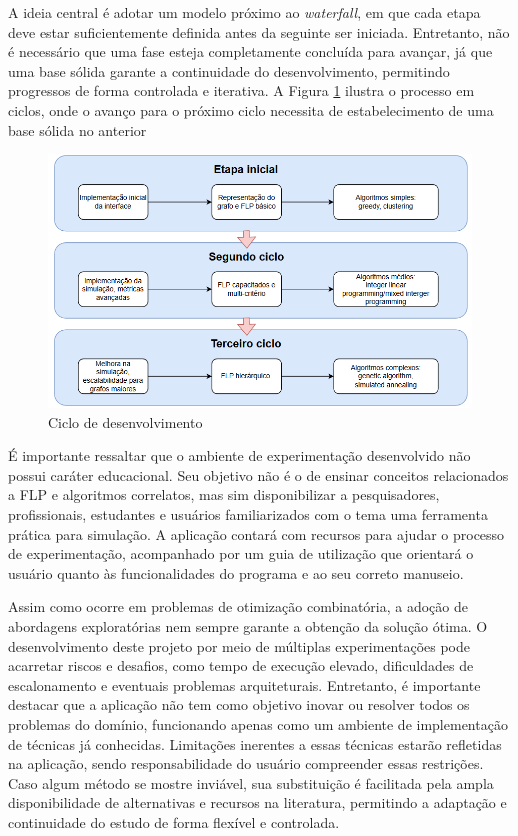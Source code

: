 A ideia central é adotar um modelo próximo ao \textit{waterfall}, em que cada etapa deve estar suficientemente definida antes da seguinte ser iniciada. Entretanto, não é necessário que uma fase esteja completamente concluída para avançar, já que uma base sólida garante a continuidade do desenvolvimento, permitindo progressos de forma controlada e iterativa. A Figura \ref{ciclo_dev} ilustra o processo em ciclos, onde o avanço para o próximo ciclo necessita de estabelecimento de uma base sólida no anterior

\begin{figure}[htb]
	\caption{\label{ciclo_dev}Ciclo de desenvolvimento}
	\begin{center}
	    \includegraphics[scale=0.8]{imagens/ciclo_dev.png}
	\end{center}
\end{figure}

\FloatBarrier

É importante ressaltar que o ambiente de experimentação desenvolvido não possui caráter educacional. Seu objetivo não é o de ensinar conceitos relacionados a FLP e algoritmos correlatos, mas sim disponibilizar a pesquisadores, profissionais, estudantes e usuários familiarizados com o tema uma ferramenta prática para simulação. A aplicação contará com recursos para ajudar o processo de experimentação, acompanhado por um guia de utilização que orientará o usuário quanto às funcionalidades do programa e ao seu correto manuseio.

Assim como ocorre em problemas de otimização combinatória, a adoção de abordagens exploratórias nem sempre garante a obtenção da solução ótima. O desenvolvimento deste projeto por meio de múltiplas experimentações pode acarretar riscos e desafios, como tempo de execução elevado, dificuldades de escalonamento e eventuais problemas arquiteturais. Entretanto, é importante destacar que a aplicação não tem como objetivo inovar ou resolver todos os problemas do domínio, funcionando apenas como um ambiente de implementação de técnicas já conhecidas. Limitações inerentes a essas técnicas estarão refletidas na aplicação, sendo responsabilidade do usuário compreender essas restrições. Caso algum método se mostre inviável, sua substituição é facilitada pela ampla disponibilidade de alternativas e recursos na literatura, permitindo a adaptação e continuidade do estudo de forma flexível e controlada. 



